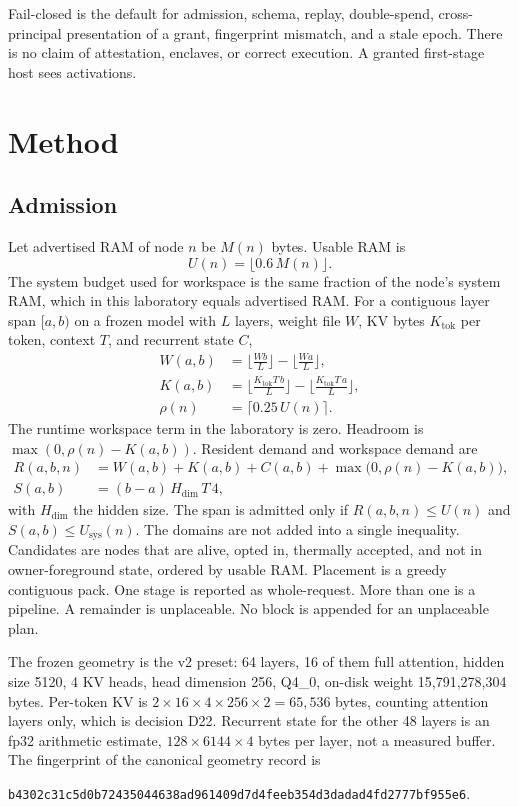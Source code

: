 \documentclass[11pt]{article}
\begin{document}
Fail-closed is the default for admission, schema, replay, double-spend, cross-principal presentation of a grant, fingerprint mismatch, and a stale epoch. There is no claim of attestation, enclaves, or correct execution. A granted first-stage host sees activations.

\section{Method}
\subsection{Admission}
\label{sec:admit}
Let advertised RAM of node \(n\) be \(M(n)\) bytes. Usable RAM is
\begin{equation}
U(n)=\lfloor 0.6\, M(n)\rfloor.
\end{equation}
The system budget used for workspace is the same fraction of the node's system RAM, which in this laboratory equals advertised RAM. For a contiguous layer span \([a,b)\) on a frozen model with \(L\) layers, weight file \(W\), KV bytes \(K_{\mathrm{tok}}\) per token, context \(T\), and recurrent state \(C\),
\begin{align}
W(a,b)&=\Big\lfloor\frac{W b}{L}\Big\rfloor-\Big\lfloor\frac{W a}{L}\Big\rfloor,\\
K(a,b)&=\Big\lfloor\frac{K_{\mathrm{tok}} T\, b}{L}\Big\rfloor-\Big\lfloor\frac{K_{\mathrm{tok}} T\, a}{L}\Big\rfloor,\\
\rho(n)&=\lceil 0.25\, U(n)\rceil.
\end{align}
The runtime workspace term in the laboratory is zero. Headroom is \(\max(0,\rho(n)-K(a,b))\). Resident demand and workspace demand are
\begin{align}
R(a,b,n)&=W(a,b)+K(a,b)+C(a,b)+\max\big(0,\rho(n)-K(a,b)\big),\\
S(a,b)&=(b-a)\,H_{\mathrm{dim}}\,T\,4,
\end{align}
with \(H_{\mathrm{dim}}\) the hidden size. The span is admitted only if \(R(a,b,n)\le U(n)\) and \(S(a,b)\le U_{\mathrm{sys}}(n)\). The domains are not added into a single inequality. Candidates are nodes that are alive, opted in, thermally accepted, and not in owner-foreground state, ordered by usable RAM. Placement is a greedy contiguous pack. One stage is reported as whole-request. More than one is a pipeline. A remainder is unplaceable. No block is appended for an unplaceable plan.

The frozen geometry is the v2 preset: 64 layers, 16 of them full attention, hidden size 5120, 4 KV heads, head dimension 256, Q4\_0, on-disk weight 15{,}791{,}278{,}304 bytes. Per-token KV is \(2 \times 16 \times 4 \times 256 \times 2 = 65{,}536\) bytes, counting attention layers only, which is decision D22. Recurrent state for the other 48 layers is an fp32 arithmetic estimate, \(128 \times 6144 \times 4\) bytes per layer, not a measured buffer. The fingerprint of the canonical geometry record is
\begin{center}
\texttt{b4302c31c5d0b72435044638ad961409d7d4feeb354d3dadad4fd2777bf955e6}.
\end{center}
\end{document}
